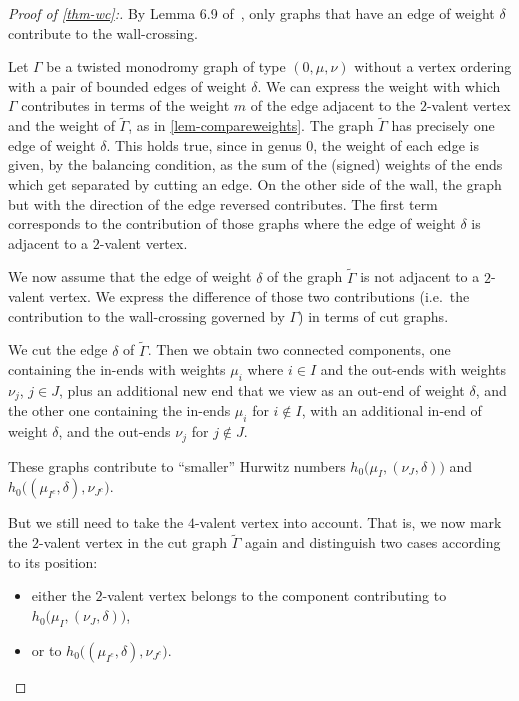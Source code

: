 \begin{proof}[Proof of \cref{thm-wc}:]
By Lemma 6.9 of~\cite{CJM10}, only graphs that have an edge of weight $\delta$ contribute to the wall-crossing.

Let $\Gamma$ be a twisted monodromy graph of type $(0,\mu,\nu)$ without a vertex ordering with a pair of bounded edges of weight $\delta$.
We can express the weight with which $\Gamma$ contributes in terms of the weight $m$ of the edge adjacent to the $2$-valent vertex and the weight of $\tilde{\Gamma}$, as in \cref{lem-compareweights}.
The graph $\tilde{\Gamma}$ has precisely one edge of weight $\delta$. This holds true, since in genus $0$, the weight of each edge is given, by the balancing condition, as the sum of the (signed) weights of the ends which get separated by cutting an edge.  
On the other side of the wall, the graph but with the direction of the edge reversed contributes. The first term corresponds to the contribution of those graphs where the edge of weight $\delta$ is adjacent to a $2$-valent vertex. 

We now assume that the edge of weight $\delta$ of the graph $\tilde{\Gamma}$ is not adjacent to a $2$-valent vertex. We express the difference of those two contributions (i.e.\ the contribution to the wall-crossing governed by $\Gamma$) in terms of cut graphs.

We cut the edge $\delta$ of $\tilde{\Gamma}$.
Then we obtain two connected components, one containing the in-ends with weights $\mu_i$ where $i\in I$ and the out-ends with weights $\nu_j$, $j\in J$, plus an additional new end that we view as an out-end of weight $\delta$, and the other one containing the in-ends $\mu_i$ for $i \notin I$, with an additional in-end of weight $\delta$, and the out-ends $\nu_j$ for $j\notin J$.

These graphs contribute to ``smaller'' Hurwitz numbers $h_0\big(\mu_I,(\nu_J,\delta)\big)$ and $h_0\big((\mu_{I^c},\delta),\nu_{J^c}\big)$.

But we still need to take the $4$-valent vertex into account.
That is, we now mark the $2$-valent vertex in the cut graph $\tilde{\Gamma}$ again and
distinguish two cases according to its position:
\begin{itemize}
    \item either the $2$-valent vertex belongs to the component contributing to $h_0\big(\mu_I,(\nu_J,\delta)\big)$, 
    \item or to $h_0\big((\mu_{I^c},\delta),\nu_{J^c}\big)$.
\end{itemize}


\end{proof}
